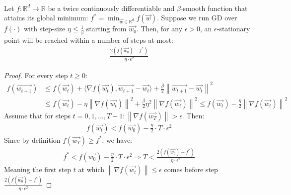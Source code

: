 \documentclass[12pt]{article}
\newcommand{\norm}[1]{\left\| #1 \right\|}
\begin{document}
	\begin{theorem}
	    \label{thm:convergence to epsilon stationary point}
	    \cite{1998-notes} \\
		Let $f:\mathbb{R}^d\to\mathbb{R}$ be a twice continuously differentiable and $\beta$-smooth function that attains its global minimum: $f^\ast = \min_{\overrightarrow{w}\in\mathbb{R}^d}{f(\overrightarrow{w})}$. Suppose we run GD over $f(\cdot)$ with step-size $\eta\leq\frac{1}{\beta}$ starting from $\overrightarrow{w_0}$. Then, for any $\epsilon>0$, an $\epsilon$-stationary point will be reached within a number of steps at most:
		\begin{align*}
		    \frac{2(f(\overrightarrow{w_0})-f^\ast)}{\eta\cdot\epsilon^2}
		\end{align*}
	\end{theorem}
	\begin{proof}
	    For every step $t\geq0$:
		\begin{align*}
		    f(\overrightarrow{w_{t+1}}) & \leq f(\overrightarrow{w_t}) + \langle\nabla{f(\overrightarrow{w_t})}, \overrightarrow{w_{t+1}} - \overrightarrow{w_t}\rangle + \frac{\beta}{2}\norm{\overrightarrow{w_{t+1}}-\overrightarrow{w_t}}^2 \\
		    & \leq f(\overrightarrow{w_t}) - \eta\norm{\nabla{f(\overrightarrow{w_t})}}^2 + \frac{\beta}{2}\eta^2\norm{\nabla{f(\overrightarrow{w_t})}}^2 \leq f(\overrightarrow{w_t}) - \frac{\eta}{2}\norm{\nabla{f(\overrightarrow{w_t})}}^2
		\end{align*}
		Assume that for steps $t=0,1,...,T-1: \norm{\nabla{f(\overrightarrow{w_T})}} > \epsilon$. Then:
		\begin{align*}
		    f(\overrightarrow{w_t}) < f(\overrightarrow{w_0}) - \frac{\eta}{2} \cdot T \cdot \epsilon^2
		\end{align*}
		Since by definition $f(\overrightarrow{w_T})\geq f^\ast$, we have:
		\begin{align*}
		    f^\ast < f(\overrightarrow{w_0}) - \frac{\eta}{2} \cdot T \cdot \epsilon^2 \Longrightarrow T < \frac{2(f(\overrightarrow{w_0}) - f^\ast)}{\eta \cdot \epsilon^2}
		\end{align*}
		Meaning the first step $t$ at which $\norm{\nabla{f(\overrightarrow{w_t})}}\leq\epsilon$ comes before step $\frac{2(f(\overrightarrow{w_0})-f^\ast)}{\eta \cdot \epsilon^2}$
	\end{proof}
\end{document}
